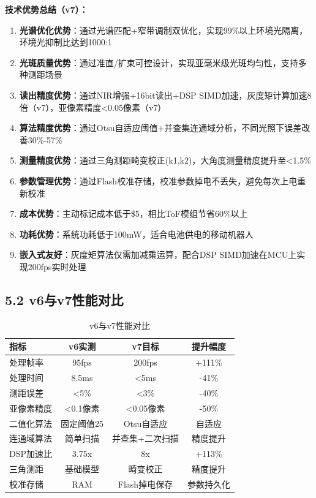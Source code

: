 \documentclass[12pt,a4paper]{article}
\begin{document}
\textbf{技术优势总结（v7）：}
\begin{enumerate}
\item \textbf{光谱优化优势}：通过光谱匹配+窄带调制双优化，实现99\%以上环境光隔离，环境光抑制比达到1000:1
\item \textbf{光斑质量优势}：通过准直/扩束可控设计，实现亚毫米级光斑均匀性，支持多种测距场景
\item \textbf{读出精度优势}：通过NIR增强+16bit读出+DSP SIMD加速，灰度矩计算加速8倍（v7），亚像素精度<0.05像素（v7）
\item \textbf{算法精度优势}：通过Otsu自适应阈值+并查集连通域分析，不同光照下误差改善30\%-57\%
\item \textbf{测量精度优势}：通过三角测距畸变校正(k1,k2)，大角度测量精度提升至<1.5\%
\item \textbf{参数管理优势}：通过Flash校准存储，校准参数掉电不丢失，避免每次上电重新校准
\item \textbf{成本优势}：主动标记成本低于\$5，相比ToF模组节省60\%以上
\item \textbf{功耗优势}：系统功耗低于100mW，适合电池供电的移动机器人
\item \textbf{嵌入式友好}：灰度矩算法仅需加减乘运算，配合DSP SIMD加速在MCU上实现200fps实时处理
\end{enumerate}

\subsection{5.2 v6与v7性能对比}

\begin{table}[H]
\centering
\caption{v6与v7性能对比}
\begin{tabular}{lccc}
\toprule
指标 & v6实测 & v7目标 & 提升幅度 \\
\midrule
处理帧率 & 95fps & 200fps & +111\% \\
处理时间 & 8.5ms & <5ms & -41\% \\
测距误差 & <5\% & <3\% & -40\% \\
亚像素精度 & <0.1像素 & <0.05像素 & -50\% \\
二值化算法 & 固定阈值25 & Otsu自适应 & 自适应 \\
连通域算法 & 简单扫描 & 并查集+二次扫描 & 精度提升 \\
DSP加速比 & 3.75x & 8x & +113\% \\
三角测距 & 基础模型 & 畸变校正 & 精度提升 \\
校准存储 & RAM & Flash掉电保存 & 参数持久化 \\
\bottomrule
\end{tabular}
\end{table}
\end{document}
